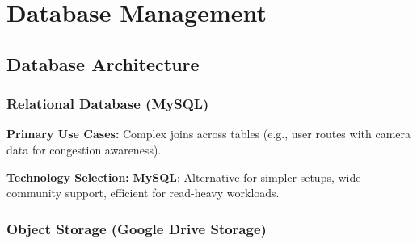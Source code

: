 \chapter{Database Management}

\section{Database Architecture}

\subsection{Relational Database (MySQL)}

\textbf{Primary Use Cases:} Complex joins across tables (e.g., user routes with camera data for congestion awareness).

\textbf{Technology Selection:} \textbf{MySQL}: Alternative for simpler setups, wide community support, efficient for read-heavy workloads.



\subsection{Object Storage (Google Drive Storage)}

